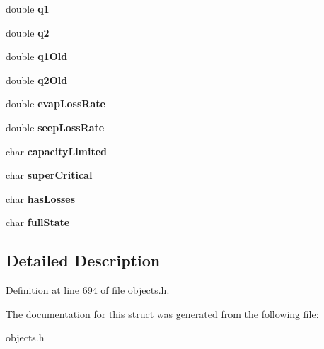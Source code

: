 \begin{DoxyCompactItemize}
\mbox{\label{struct_t_conduit_a27d440b2aadebaa8d4a57a459dc3becb}} 
double {\bfseries q1}
\item 
\mbox{\label{struct_t_conduit_a50dab66788f332691199ea45f7d7bbef}} 
double {\bfseries q2}
\item 
\mbox{\label{struct_t_conduit_acc82cf20fef731ac0930484b07a0e7a1}} 
double {\bfseries q1\+Old}
\item 
\mbox{\label{struct_t_conduit_a806ae1a19efdc6e809240070090471bb}} 
double {\bfseries q2\+Old}
\item 
\mbox{\label{struct_t_conduit_affd8b5c5c0e0e2f26b4bd5c739d8ac08}} 
double {\bfseries evap\+Loss\+Rate}
\item 
\mbox{\label{struct_t_conduit_a5445cd919bab24845212eb821483eec0}} 
double {\bfseries seep\+Loss\+Rate}
\item 
\mbox{\label{struct_t_conduit_ad2df954c0429d258e859f4ff7dfbd0d2}} 
char {\bfseries capacity\+Limited}
\item 
\mbox{\label{struct_t_conduit_aa1a36c155079ce47b837d6542dd67b01}} 
char {\bfseries super\+Critical}
\item 
\mbox{\label{struct_t_conduit_af87a41079e3c97b4ccae8ff6e57bc5e3}} 
char {\bfseries has\+Losses}
\item 
\mbox{\label{struct_t_conduit_a098da25a18908d0091f9a0f49a1dc148}} 
char {\bfseries full\+State}
\end{DoxyCompactItemize}


\subsection{Detailed Description}


Definition at line 694 of file objects.\+h.



The documentation for this struct was generated from the following file\+:\begin{DoxyCompactItemize}
\item 
objects.\+h\end{DoxyCompactItemize}
